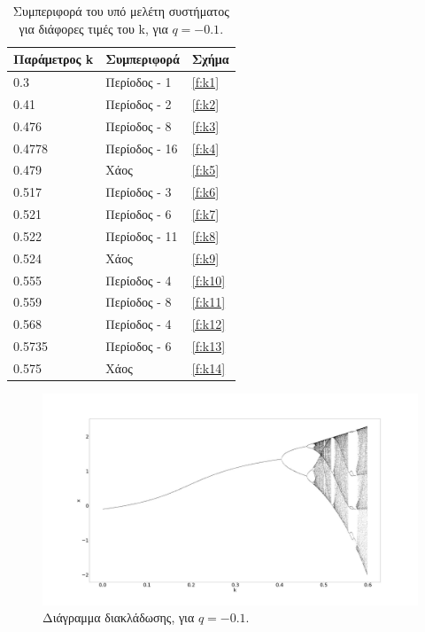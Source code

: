 \begin{table}[ht]
	\centering
	\caption{Συμπεριφορά του υπό μελέτη συστήματος για διάφορες τιμές του k, για $q=-0.1$.}
	\begin{tabular}{l | l | l}
		Παράμετρος k & Συμπεριφορά & Σχήμα\\
		\hline
		0.3 &  Περίοδος - 1 & \ref{f:k1}\\
		0.41 & Περίοδος - 2 & \ref{f:k2}\\
		0.476 &  Περίοδος - 8 & \ref{f:k3}\\
		0.4778 & Περίοδος - 16 & \ref{f:k4}\\
		0.479 & Χάος & \ref{f:k5}\\
		0.517 & Περίοδος - 3 & \ref{f:k6}\\
		0.521 & Περίοδος - 6 & \ref{f:k7}\\
		0.522 & Περίοδος - 11 & \ref{f:k8}\\
		0.524 & Χάος & \ref{f:k9}\\
		0.555 & Περίοδος - 4 & \ref{f:k10}\\
		0.559 & Περίοδος - 8 & \ref{f:k11}\\
		0.568 & Περίοδος - 4 & \ref{f:k12}\\
		0.5735 & Περίοδος - 6 & \ref{f:k13}\\
		0.575 & Χάος & \ref{f:k14}\\
	\end{tabular}
	
	\label{tab:abc}
\end{table}


\begin{figure}[ht]
	\centering
	\includegraphics[width=1\linewidth]{LateX images/graphs/g1}
	\caption{ Διάγραμμα διακλάδωσης, για $q=-0.1$.}
	\label{f:g1}	
\end{figure}

